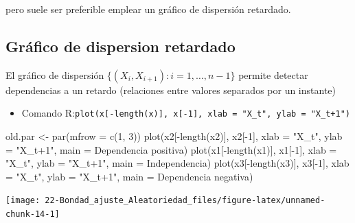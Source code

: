 \documentclass[
]{book}
\newenvironment{Shaded}{\begin{snugshade}}{\end{snugshade}}
\newcommand{\AttributeTok}[1]{\textcolor[rgb]{0.77,0.63,0.00}{#1}}
\newcommand{\DecValTok}[1]{\textcolor[rgb]{0.00,0.00,0.81}{#1}}
\newcommand{\FunctionTok}[1]{\textcolor[rgb]{0.00,0.00,0.00}{#1}}
\newcommand{\NormalTok}[1]{#1}
\newcommand{\OtherTok}[1]{\textcolor[rgb]{0.56,0.35,0.01}{#1}}
\newcommand{\SpecialCharTok}[1]{\textcolor[rgb]{0.00,0.00,0.00}{#1}}
\newcommand{\StringTok}[1]{\textcolor[rgb]{0.31,0.60,0.02}{#1}}
\providecommand{\tightlist}{%
  \setlength{\itemsep}{0pt}\setlength{\parskip}{0pt}}
\theoremstyle{break}
\theoremstyle{nonumberplain}
\begin{document}
pero suele ser preferible emplear un gráfico de dispersión retardado.

\hypertarget{gruxe1fico-de-dispersion-retardado}{%
\subsection{Gráfico de dispersion retardado}\label{gruxe1fico-de-dispersion-retardado}}

El gráfico de dispersión \(\{(X_{i},X_{i+1}) : i = 1, \ldots, n-1 \}\) permite
detectar dependencias a un retardo (relaciones entre valores separados
por un instante)

\begin{itemize}
\tightlist
\item
  Comando R:\texttt{plot(x{[}-length(x){]},\ x{[}-1{]},\ xlab\ =\ "X\_t",\ ylab\ =\ "X\_t+1")}
\end{itemize}

\begin{Shaded}
\begin{Highlighting}[]
\NormalTok{old.par }\OtherTok{\textless{}{-}} \FunctionTok{par}\NormalTok{(}\AttributeTok{mfrow =} \FunctionTok{c}\NormalTok{(}\DecValTok{1}\NormalTok{, }\DecValTok{3}\NormalTok{))}
\FunctionTok{plot}\NormalTok{(x2[}\SpecialCharTok{{-}}\FunctionTok{length}\NormalTok{(x2)], x2[}\SpecialCharTok{{-}}\DecValTok{1}\NormalTok{], }\AttributeTok{xlab =} \StringTok{"X\_t"}\NormalTok{, }\AttributeTok{ylab =} \StringTok{"X\_t+1"}\NormalTok{, }\AttributeTok{main =} \StringTok{\textquotesingle{}Dependencia positiva\textquotesingle{}}\NormalTok{)}
\FunctionTok{plot}\NormalTok{(x1[}\SpecialCharTok{{-}}\FunctionTok{length}\NormalTok{(x1)], x1[}\SpecialCharTok{{-}}\DecValTok{1}\NormalTok{], }\AttributeTok{xlab =} \StringTok{"X\_t"}\NormalTok{, }\AttributeTok{ylab =} \StringTok{"X\_t+1"}\NormalTok{, }\AttributeTok{main =} \StringTok{\textquotesingle{}Independencia\textquotesingle{}}\NormalTok{)}
\FunctionTok{plot}\NormalTok{(x3[}\SpecialCharTok{{-}}\FunctionTok{length}\NormalTok{(x3)], x3[}\SpecialCharTok{{-}}\DecValTok{1}\NormalTok{], }\AttributeTok{xlab =} \StringTok{"X\_t"}\NormalTok{, }\AttributeTok{ylab =} \StringTok{"X\_t+1"}\NormalTok{, }\AttributeTok{main =} \StringTok{\textquotesingle{}Dependencia negativa\textquotesingle{}}\NormalTok{)}
\end{Highlighting}
\end{Shaded}

\begin{center}\texttt{[image: 22-Bondad\_ajuste\_Aleatoriedad\_files/figure-latex/unnamed-chunk-14-1]} \end{center}
\end{document}
